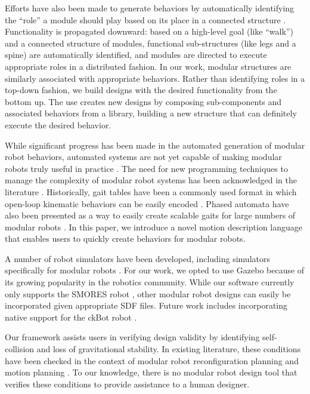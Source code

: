 \documentclass[graybox]{svmult}
\begin{document}
Efforts have also been made to generate behaviors by automatically identifying the ``role'' a module should play based on its place in a connected structure \cite{stoy2002using}.  Functionality is propagated downward: based on a high-level goal (like ``walk'') and a connected structure of modules, functional sub-structures (like legs and a spine) are automatically identified, and modules are directed to execute appropriate roles in a distributed fashion.  In our work, modular structures are similarly associated with appropriate behaviors. Rather than identifying roles in a top-down fashion, we build designs with the desired functionality from the bottom up. The use creates new designs by composing sub-components and associated behaviors from a library, building a new structure that can definitely execute the desired behavior.

While significant progress has been made in the automated generation of modular
robot behaviors, automated systems are not yet capable of making modular robots
truly useful in practice \cite{yim2007modular}.  The need for new programming
techniques to manage the complexity of modular robot systems has been
acknowledged in the literature \cite{yim2000modular}. Historically, gait tables
have been a commonly used format in which open-loop kinematic behaviors can be
easily encoded \cite{yim1994locomotion}. Phased automata have also been
presented as a way to easily create scalable gaits for large numbers of modular
robots \cite{zhang2003phase}. In this paper, we introduce a novel motion
description language that enables users to quickly create behaviors for modular
robots.

A number of robot simulators have been developed, including simulators specifically for modular robots \cite{christensen2008unified}. For our work, we opted to use Gazebo \cite{koenig2004design} because of its growing popularity in the robotics community. While our software currently only supports the SMORES robot \cite{Davey2012}, other modular robot designs can easily be incorporated given appropriate SDF files. Future work includes incorporating native support for the ckBot robot \cite{davey2012modlock}.

Our framework assists users in verifying design validity by identifying self-
collision and loss of gravitational stability. In existing literature, these
conditions have been checked in the context of modular robot reconfiguration
planning \cite{casal2001reconfiguration} and motion planning
\cite{yoshida2002self}. To our knowledge, there is no modular robot design tool
that verifies these conditions to provide assistance to a human designer.
\end{document}
